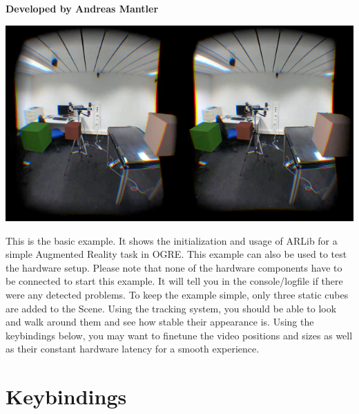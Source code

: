 \begin{center}
\textbf{Developed by Andreas Mantler}
\end{center}
\includegraphics*[width=\textwidth]{SimpleSceneThumb.png}

This is the basic example. It shows the initialization and usage of ARLib for a simple Augmented Reality task in OGRE. This example can also be used to test the hardware setup. Please note that none of the hardware components have to be connected to start this example. It will tell you in the console/logfile if there were any detected problems. To keep the example simple, only three static cubes are added to the Scene. Using the tracking system, you should be able to look and walk around them and see how stable their appearance is. Using the keybindings below, you may want to finetune the video positions and sizes as well as their constant hardware latency for a smooth experience.

\section{Keybindings}\label{keybindings-1}

